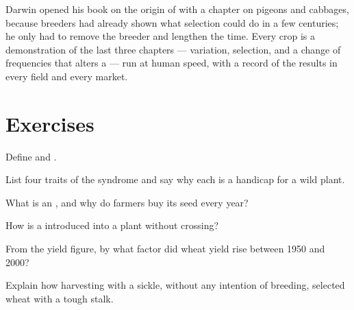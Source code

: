 \begin{remark}\label{rem:g12:domesticated-plants:oldest}
Darwin opened his book on the origin of  with a chapter on
pigeons and cabbages, because breeders had already shown what
selection could do in a few centuries; he only had to remove the
breeder and lengthen the time. Every crop is a demonstration of the
last three chapters --- variation, selection, and a change of
frequencies that alters a  --- run at human speed, with a
record of the results in every field and every market.
\end{remark}

\section{Exercises}

\begin{exercise}[$\star$]\label{exo:g12:domesticated-plants:1}
Define  and .
\end{exercise}

\begin{exercise}[$\star$]\label{exo:g12:domesticated-plants:2}
List four traits of the  syndrome and say why each is a
handicap for a wild plant.
\end{exercise}

\begin{exercise}[$\star$]\label{exo:g12:domesticated-plants:3}
What is an , and why do farmers buy its seed every year?
\end{exercise}

\begin{exercise}[$\star$]\label{exo:g12:domesticated-plants:4}
How is a  introduced into a plant without crossing?
\end{exercise}

\begin{exercise}[$\star$]\label{exo:g12:domesticated-plants:5}
From the yield figure, by what factor did wheat yield rise between
1950 and 2000?
\end{exercise}

\begin{exercise}[$\star\star$]\label{exo:g12:domesticated-plants:6}
Explain how harvesting with a sickle, without any intention of
breeding, selected wheat with a tough stalk.
\end{exercise}

